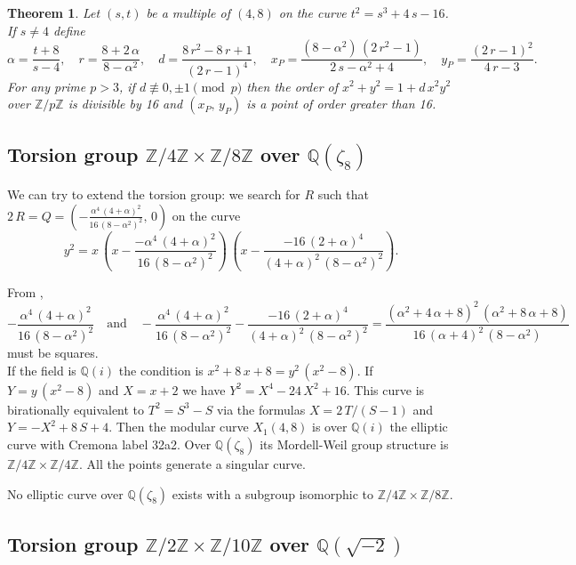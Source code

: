 \documentclass[a4paper, 11pt, pdftex]{report}
\theoremstyle{plain}
\newtheorem{theorem}{Theorem}[chapter]
\theoremstyle{definition}
\begin{document}
\begin{theorem}
Let $(s, t)$ be a multiple of $(4, 8)$ on the curve $t^2 = s^3 + 4\,s - 16$. If
$s \neq 4$  define
$$\alpha = \frac{t + 8}{s - 4},\quad r = \frac{8 + 2\,\alpha}{8 - \alpha^2},\quad
d = \frac{8\,r^2 - 8\,r + 1}{(2\,r - 1)^4},\quad
x_P = \frac{(8 - \alpha^2)\,(2\,r^2 - 1)}{2\,s - \alpha^2 + 4},\quad
y_P = \frac{(2\,r - 1)^2}{4\,r - 3}.$$
For any prime $p > 3$, if $d \not\equiv 0, \pm1 \pmod p$ then the order of
$x^2 + y^2 = 1 + d\,x^2y^2$ over $\mathbb{Z}/p\mathbb{Z}$ is divisible by 16
and $(x_P,\,y_P)$ is a point of order greater than 16.
\end{theorem}

\subsection{Torsion group $\mathbb{Z}/4\mathbb{Z} \times \mathbb{Z}/8\mathbb{Z}$ over $\mathbb{Q}(\zeta_8)$}

We can try to extend the torsion group: we search for $R$ such that
$2\,R = Q = \left(-\frac{\alpha^4\,(4 + \alpha)^2}{16\,(8 - \alpha^2)^2},\, 0\right)$
on the curve
$$y^2 = x\, \left(x - \frac{-\alpha^4\,(4 + \alpha)^2}{16\,(8 - \alpha^2)^2} \right)\,
 \left(x - \frac{-16\,(2 + \alpha)^4}{(4 + \alpha)^2\,(8 - \alpha^2)^2} \right).$$

From \cite[Theorem 4.2]{Knapp1},
$$-\frac{\alpha^4\,(4 + \alpha)^2}{16\,(8 - \alpha^2)^2} \quad \text{and} \quad
-\frac{\alpha^4\,(4 + \alpha)^2}{16\,(8 - \alpha^2)^2}
 - \frac{-16\,(2 + \alpha)^4}{(4 + \alpha)^2\,(8 - \alpha^2)^2}
 = \frac{(\alpha^2 + 4\,\alpha + 8)^2\,(\alpha^2 + 8\,\alpha + 8)}{16\,(\alpha+4)^2\,(8 - \alpha^2)}$$
must be squares.\\
If the field is $\mathbb{Q}(i)$ the condition is $x^2 + 8\,x + 8 = y^2\,(x^2 - 8)$.
If $Y = y\,(x^2 - 8)$ and $X = x + 2$ we have $Y^2 = X^4 - 24\,X^2 + 16$. This curve is
birationally equivalent to $T^2 = S^3 - S$ via the formulas $X = 2\,T / (S - 1)$ and
$Y = -X^2 + 8\,S + 4$. Then the modular curve $X_1(4, 8)$ is over $\mathbb{Q}(i)$
the elliptic curve with Cremona label 32a2. Over $\mathbb{Q}(\zeta_8)$ its Mordell-Weil group
structure is $\mathbb{Z}/4\mathbb{Z} \times \mathbb{Z}/4\mathbb{Z}$. All the points generate
a singular curve.

No elliptic curve over $\mathbb{Q}(\zeta_8)$ exists with a subgroup isomorphic to
$\mathbb{Z}/4\mathbb{Z} \times \mathbb{Z}/8\mathbb{Z}$.

\subsection{Torsion group $\mathbb{Z}/2\mathbb{Z} \times \mathbb{Z}/10\mathbb{Z}$ over $\mathbb{Q}(\sqrt{-2})$}
\end{document}
